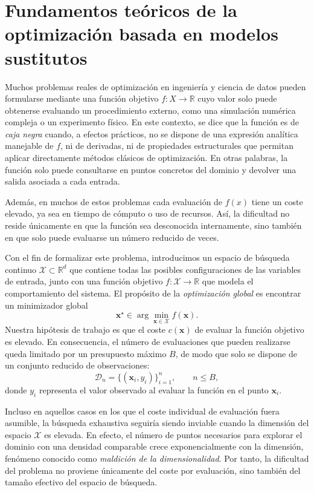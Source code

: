 \chapter{Fundamentos teóricos de la optimización basada en modelos sustitutos}
\label{chap:marco_teorico}

Muchos problemas reales de optimización en ingeniería y ciencia de datos pueden formularse mediante una función objetivo $f : X \to \mathbb{R}$ cuyo valor solo puede obtenerse evaluando un procedimiento externo, como una simulación numérica compleja o un experimento físico. En este contexto, se dice que la función es de \textit{caja negra} cuando, a efectos prácticos, no se dispone de una expresión analítica manejable de $f$, ni de derivadas, ni de propiedades estructurales que permitan aplicar directamente métodos clásicos de optimización. En otras palabras, la función solo puede consultarse en puntos concretos del dominio y devolver una salida asociada a cada entrada.

Además, en muchos de estos problemas cada evaluación de $f(x)$ tiene un coste elevado, ya sea en tiempo de cómputo o uso de recursos. Así, la dificultad no reside únicamente en que la función sea desconocida internamente, sino también en que solo puede evaluarse un número reducido de veces.


\vspace{0.3cm}
Con el fin de formalizar este problema, introducimos un espacio de búsqueda continuo $\mathcal{X}\subset\mathbb{R}^{d}$ que contiene todas las posibles configuraciones de las variables de entrada, junto con una función objetivo $f:\mathcal{X}\to\mathbb{R}$ que modela el comportamiento del sistema. El propósito de la \emph{optimización global} es encontrar un minimizador global
\[
\bm{x}^{\star} \in \arg\min_{\bm{x}\in\mathcal{X}} f(\bm{x}).
\]
Nuestra hipótesis de trabajo es que el coste $c(\bm{x})$ de evaluar la función objetivo es elevado. En consecuencia, el número de evaluaciones que pueden realizarse queda limitado por un presupuesto máximo $B$, de modo que solo se dispone de un conjunto reducido de observaciones:
\[
\mathcal{D}_n = \{(\bm{x}_i, y_i)\}_{i=1}^{n}, \qquad n \leq B,
\]
donde $y_i$ representa el valor observado al evaluar la función en el punto $\bm{x}_i$.

Incluso en aquellos casos en los que el coste individual de evaluación fuera asumible, la búsqueda exhaustiva seguiría siendo inviable cuando la dimensión del espacio $\mathcal{X}$ es elevada. En efecto, el número de puntos necesarios para explorar el dominio con una densidad comparable crece exponencialmente con la dimensión, fenómeno conocido como \emph{maldición de la dimensionalidad}. Por tanto, la dificultad del problema no proviene únicamente del coste por evaluación, sino también del tamaño efectivo del espacio de búsqueda. 

